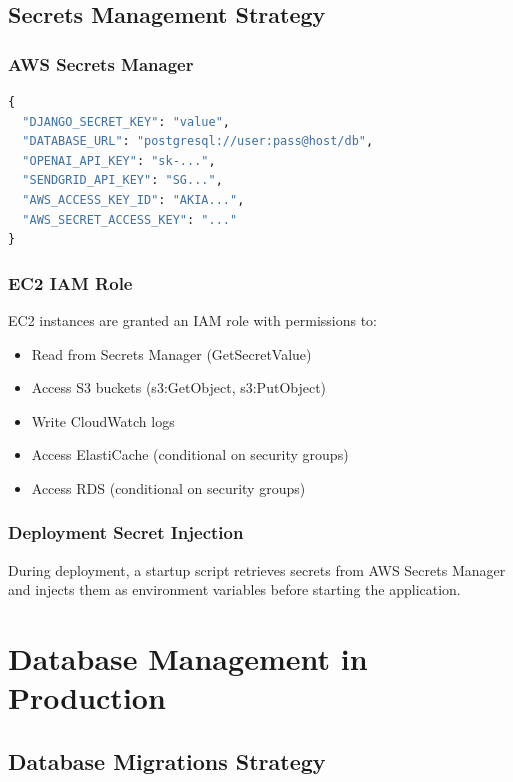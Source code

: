 \documentclass{report}
\begin{document}
\section{Secrets Management Strategy}

\subsection{AWS Secrets Manager}

\begin{lstlisting}[language=Python, caption=AWS Secrets Manager Secret Structure]
{
  "DJANGO_SECRET_KEY": "value",
  "DATABASE_URL": "postgresql://user:pass@host/db",
  "OPENAI_API_KEY": "sk-...",
  "SENDGRID_API_KEY": "SG...",
  "AWS_ACCESS_KEY_ID": "AKIA...",
  "AWS_SECRET_ACCESS_KEY": "..."
}
\end{lstlisting}

\subsection{EC2 IAM Role}

EC2 instances are granted an IAM role with permissions to:

\begin{itemize}
  \item Read from Secrets Manager (GetSecretValue)
  \item Access S3 buckets (s3:GetObject, s3:PutObject)
  \item Write CloudWatch logs
  \item Access ElastiCache (conditional on security groups)
  \item Access RDS (conditional on security groups)
\end{itemize}

\subsection{Deployment Secret Injection}

During deployment, a startup script retrieves secrets from AWS Secrets Manager and injects them as environment variables before starting the application.

\chapter{Database Management in Production}

\section{Database Migrations Strategy}
\end{document}
